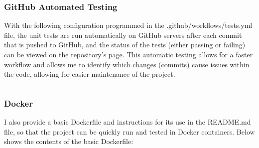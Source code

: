 \documentclass[./project-report/src/latex/project-report.tex]{subfiles}
\begin{document}
\subsubsection{GitHub Automated Testing}

With the following configuration programmed in the .github/workflows/tests.yml file, the unit tests are run automatically on GitHub servers after each commit that is pushed to GitHub, 
and the status of the tests (either passing or failing) can be viewed on the repository's page. This automatic testing allows for a faster workflow and allows me to identify which changes 
(commits) cause issues within the code, allowing for easier maintenance of the project.

\inputminted{yaml}{./.github/workflows/tests.yml}

\subsubsection{Docker}

I also provide a basic Dockerfile and instructions for its use in the README.md file, so that the project can be quickly run and tested in Docker containers. Below 
shows the contents of the basic Dockerfile:

\inputminted{docker}{./Dockerfile}
\end{document}
